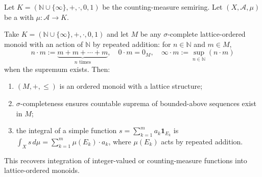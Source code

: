 \begin{definition} \label{definition:integer_valued_integration_as_special_case}
Let $K = (\mathbb{N} \cup \{\infty\}, +, \cdot, 0, 1)$ be the counting-measure semiring. Let $(X,\mathcal{A},\mu)$ be a  with $\mu : \mathcal{A} \to K$.

Take $K = (\mathbb{N} \cup \{\infty\}, +, \cdot, 0, 1)$ and let $M$ be any $\sigma$-complete lattice-ordered monoid with an action of $\mathbb{N}$ by repeated addition: for $n \in \mathbb{N}$ and $m \in M$,
$$n \cdot m := \underbrace{m + m + \cdots + m}_{n \text{ times}}, \quad 0 \cdot m = 0_M, \quad \infty \cdot m := \sup_{n \in \mathbb{N}} (n \cdot m)$$
when the supremum exists. Then:
\begin{enumerate}
    \item $(M, +, \leq)$ is an ordered monoid with a lattice structure;
    \item $\sigma$-completeness ensures countable suprema of bounded-above sequences exist in $M$;
    \item the integral of a simple function $s = \sum_{k=1}^m a_k \mathbf{1}_{E_k}$ is $\int_X s\,d\mu = \sum_{k=1}^m \mu(E_k) \cdot a_k$, where $\mu(E_k)$ acts by repeated addition.
\end{enumerate}

This recovers integration of integer-valued or counting-measure functions into lattice-ordered monoids.
\end{definition}
